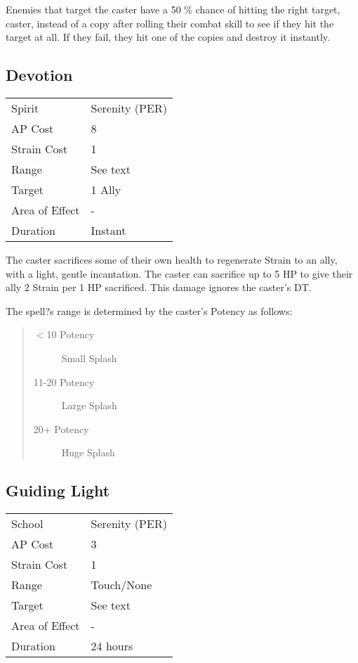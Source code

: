 \documentclass[11pt,a4paper,twocolumn]{book}
\begin{document}
Enemies that target the caster have a 50 \% chance of hitting the right target, caster, instead of a copy after rolling their combat skill to see if they hit the target at all. If they fail, they hit one of the copies and destroy it instantly.

\subsection*{Devotion}
{
	\begin{tabu} to 75mm{| X[l,4] | X[l,7] |}
		\hline
		Spirit         & Serenity (PER) \\
		AP Cost        & 8              \\
		Strain Cost    & 1              \\
		Range          & See text    \\
		Target         & 1 Ally       \\
		Area of Effect & -              \\
		Duration       & Instant        \\ \hline
	\end{tabu}
	
}
\medskip

The caster sacrifices some of their own health to regenerate Strain to an ally, with a light, gentle incantation. The caster can sacrifice up to 5 HP to give their ally 2 Strain per 1 HP sacrificed. This damage ignores the caster's DT.

The spell?s range is determined by the caster's Potency as follows:
\begin{quote}
	\begin{description}
		\item[$<$10 Potency]	Small Splash
		\item[11-20 Potency]	Large Splash
		\item[20+ Potency]		Huge Splash
	\end{description}	
\end{quote}

\subsection*{Guiding Light}
{
	\begin{tabu} to 75mm{| X[l,4] | X[l,7] |}
		\hline
		School 			&  Serenity (PER)			\\
		AP Cost	      	&  3					\\
		Strain Cost     &  1					\\
		Range     		&  Touch/None			\\
		Target      	&  See text				\\
		Area of Effect  &  -	 				\\
		Duration     	&  24 hours				\\ \hline
	\end{tabu}
	
}
\end{document}
